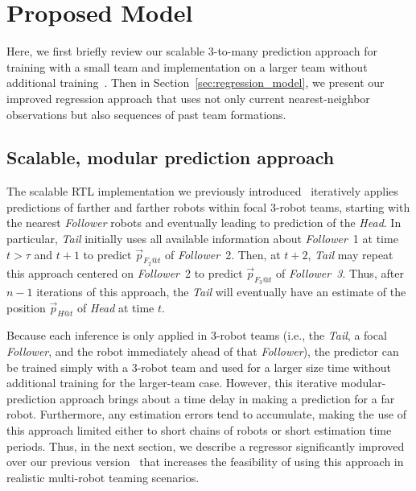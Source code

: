 \documentclass[letterpaper, 10 pt, conference]{ieeeconf}  %
\begin{document}

	\section{Proposed Model}
	\label{sec:method}

    Here, we first briefly review our scalable 3-to-many prediction
    approach for training with a small team and implementation on a
    larger team without additional training~\cite{CPR17}. Then in
    Section~\ref{sec:regression_model}, we present our improved
    regression approach that uses not only current nearest-neighbor
    observations but also sequences of past team formations.

    \subsection{Scalable, modular prediction approach}
	\label{sec:scalable_prediction}

    The scalable RTL implementation we previously
    introduced~\cite{CPR17} iteratively applies predictions of farther
    and farther robots within focal 3-robot teams, starting with the
    nearest \emph{Follower} robots and eventually leading to prediction
    of the \emph{Head}. In particular, \emph{Tail} initially uses all
    available information about \emph{Follower}~1 at time $t > \tau$ and
    $t+1$ to predict $\vec{p}_{F_2@t}$ of \emph{Follower}~2. Then,
    at $t+2$, \emph{Tail} may repeat this approach centered on
    \emph{Follower}~2 to predict $\vec{p}_{F_3@t}$ of
    \emph{Follower~3}. Thus, after $n-1$ iterations of this approach,
    the \emph{Tail} will eventually have an estimate of the position
    $\vec{p}_{H@t}$ of \emph{Head} at time $t$.

    Because each inference is only applied in 3-robot teams (i.e.,
    the \emph{Tail}, a focal \emph{Follower}, and the robot
    immediately ahead of that \emph{Follower}), the predictor can be
    trained simply with a $3$-robot team and used for a larger size time
    without additional training for the larger-team case.
    However, this iterative modular-prediction approach brings about a
    time delay in making a prediction for a far robot. Furthermore, any
    estimation errors tend to accumulate, making the use of this
    approach limited either to short chains of robots or short
    estimation time periods. Thus, in the next section, we describe a
    regressor significantly improved over our previous
    version~\cite{CPR17} that increases the feasibility of using this
    approach in realistic multi-robot teaming scenarios.
\end{document}
